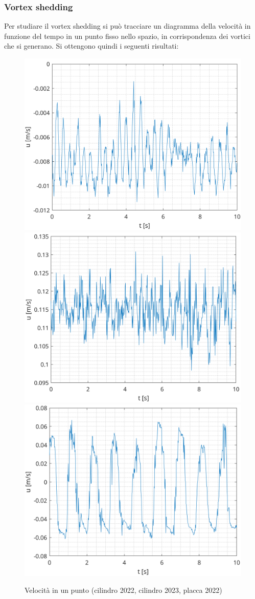 \subsubsection{Vortex shedding}
Per studiare il vortex shedding si può tracciare un diagramma della velocità in funzione del tempo in un punto fisso nello spazio, in corrispondenza dei vortici che si generano. Si ottengono quindi i seguenti risultati:
\begin{figure}[H]
    \centering
    \includegraphics[width=.46\textwidth]{images/11/timeseries22.png}
    \includegraphics[width=.46\textwidth]{images/11/timeseries23.png}
    \includegraphics[width=.46\textwidth]{images/11/timeseries220.png}
    \caption{Velocità in un punto (cilindro 2022, cilindro 2023, placca 2022)}
\end{figure}

